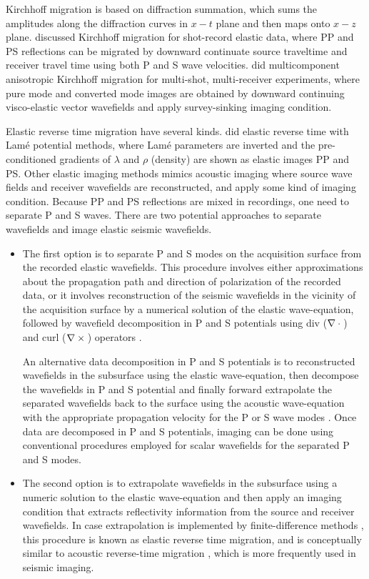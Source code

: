 Kirchhoff migration is based on diffraction summation, which sums the amplitudes along the diffraction curves in $x-t$ plane and then maps onto $x-z$ plane.
\cite{GEO49-08-12231238} discussed Kirchhoff migration for shot-record elastic data, where PP and PS reflections can be migrated by downward continuate source traveltime and receiver travel time using both P and S wave velocities. 
\cite{hokstad:861} did multicomponent anisotropic Kirchhoff migration for multi-shot, multi-receiver experiments, where pure mode and converted mode images are obtained by downward continuing visco-elastic vector wavefields and apply survey-sinking imaging condition.

Elastic reverse time migration have several kinds. \cite{GEO63-05-16851695} did elastic reverse time with Lam\'e potential methods, where Lam\'e parameters are inverted and the pre-conditioned gradients of $\lambda$ and $\rho$ (density) are shown as elastic images PP and PS. Other elastic imaging methods mimics acoustic imaging where source wave fields and receiver wavefields are reconstructed, and apply some kind of imaging condition. Because PP and PS reflections are mixed in recordings, one need to separate P and S waves. There are two potential approaches to separate wavefields and image elastic seismic wavefields.
\begin{itemize}
\item
The first option is to separate P and S modes on the acquisition
surface from the recorded elastic wavefields. This procedure involves
either approximations about the propagation path and direction of
polarization of the recorded data, or it involves reconstruction of
the seismic wavefields in the vicinity of the acquisition surface by a
numerical solution of the elastic wave-equation, followed by wavefield
decomposition in P and S potentials using div ($\nabla \cdot {}$) and curl
($\nabla \times {}$) operators \cite[]{SEG-1988-S12.4,GEO62-02-05980613}.

An alternative data decomposition in P and S potentials is to
reconstructed wavefields in the subsurface using the elastic
wave-equation, then decompose the wavefields in P and S potential and
finally forward extrapolate the separated wavefields back to the
surface using the acoustic wave-equation with the appropriate
propagation velocity for the P or S wave modes
\cite[]{sun.elastic.rtm}. Once data are decomposed in P and S
potentials, imaging can be done using conventional procedures employed
for scalar wavefields for the separated P and S modes.

\item
The second option is to extrapolate wavefields in the subsurface using
a numeric solution to the elastic wave-equation and then apply an
imaging condition that extracts reflectivity information from the
source and receiver wavefields. In case extrapolation is implemented
by finite-difference methods
\cite[]{chang:67,chang:597}, this procedure is known
as elastic reverse time migration, and is conceptually similar to
acoustic reverse-time migration \cite[]{MSD00-00-04520462}, which is
more frequently used in seismic imaging.
\end{itemize}

